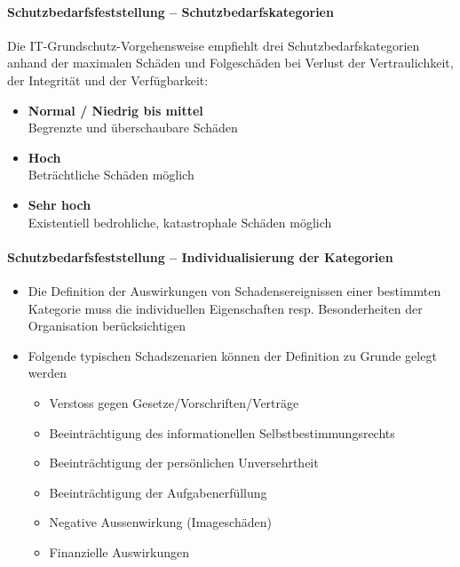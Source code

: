 \documentclass[10pt,a4paper]{article}
\begin{document}
\paragraph*{Schutzbedarfsfeststellung – Schutzbedarfskategorien} Die IT-Grundschutz-Vorgehensweise empfiehlt drei Schutzbedarfskategorien anhand der maximalen Schäden und Folgeschäden bei Verlust der Vertraulichkeit, der Integrität und der Verfügbarkeit:
\begin{itemize}[noitemsep,topsep=0pt,leftmargin=*]
    \item \textbf{Normal / Niedrig bis mittel}\\Begrenzte und überschaubare Schäden
    \item \textbf{Hoch}\\Beträchtliche Schäden möglich
    \item \textbf{Sehr hoch}\\Existentiell bedrohliche, katastrophale Schäden
    möglich
\end{itemize}

\paragraph*{Schutzbedarfsfeststellung – Individualisierung der Kategorien}
\begin{itemize}[noitemsep,topsep=0pt,leftmargin=*]
    \item Die Definition der Auswirkungen von Schadensereignissen einer bestimmten Kategorie muss die individuellen Eigenschaften resp. Besonderheiten der Organisation berücksichtigen
    \item Folgende typischen Schadszenarien können der Definition zu Grunde gelegt werden
    \begin{itemize}[noitemsep,topsep=0pt,leftmargin=*]
        \item Verstoss gegen Gesetze/Vorschriften/Verträge
        \item Beeinträchtigung des informationellen Selbstbestimmungsrechts
        \item Beeinträchtigung der persönlichen Unversehrtheit
        \item Beeinträchtigung der Aufgabenerfüllung
        \item Negative Aussenwirkung (Imageschäden)
        \item Finanzielle Auswirkungen
    \end{itemize}
\end{itemize}
\end{document}
